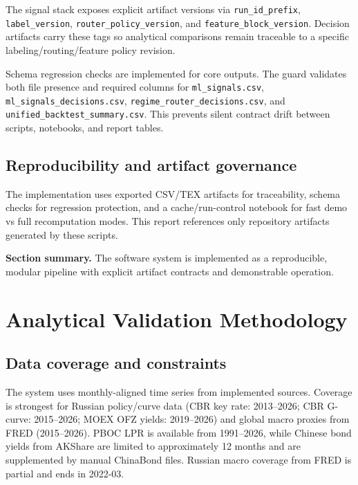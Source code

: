 \documentclass[a4paper,12pt]{extarticle}
\begin{document}
The signal stack exposes explicit artifact versions via \texttt{run\_id\_prefix}, \texttt{label\_version}, \texttt{router\_policy\_version}, and \texttt{feature\_block\_version}. Decision artifacts carry these tags so analytical comparisons remain traceable to a specific labeling/routing/feature policy revision.

Schema regression checks are implemented for core outputs. The guard validates both file presence and required columns for \texttt{ml\_signals.csv}, \texttt{ml\_signals\_decisions.csv}, \texttt{regime\_router\_decisions.csv}, and \texttt{unified\_backtest\_summary.csv}. This prevents silent contract drift between scripts, notebooks, and report tables.

\subsection{Reproducibility and artifact governance}

The implementation uses exported CSV/TEX artifacts for traceability, schema checks for regression protection, and a cache/run-control notebook for fast demo vs full recomputation modes. This report references only repository artifacts generated by these scripts.

\textbf{Section summary.} The software system is implemented as a reproducible, modular pipeline with explicit artifact contracts and demonstrable operation.

\section{Analytical Validation Methodology}

\subsection{Data coverage and constraints}

The system uses monthly-aligned time series from implemented sources. Coverage is strongest for Russian policy/curve data (CBR key rate: 2013--2026; CBR G-curve: 2015--2026; MOEX OFZ yields: 2019--2026) and global macro proxies from FRED (2015--2026). PBOC LPR is available from 1991--2026, while Chinese bond yields from AKShare are limited to approximately 12 months and are supplemented by manual ChinaBond files. Russian macro coverage from FRED is partial and ends in 2022-03.
\end{document}
